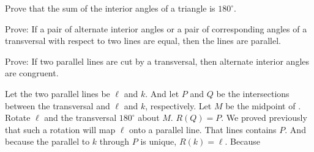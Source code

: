 \documentclass[nooutcomes]{ximera}
\begin{document}
\begin{question}
Prove that the sum of the interior angles of a triangle is $180^\circ$.
\end{question}

\begin{question}
Prove: If a pair of alternate interior angles or a pair of corresponding angles of a transversal with respect to two lines are equal, then the lines are parallel.
\begin{freeResponse}
\begin{hint}
\end{hint}
\end{freeResponse}
\end{question}

\begin{question}
Prove: If two parallel lines are cut by a transversal, then alternate interior angles are congruent.  
\begin{freeResponse}
\begin{hint}
Let the two parallel lines be $\ell$ and $k$.  And let $P$ and $Q$ be the intersections between the transversal and $\ell$ and $k$, respectively.  Let $M$ be the midpoint of .  Rotate $\ell$ and the transversal $180^\circ$ about $M$.  $R(Q)=P$.  We proved previously that such a rotation will map $\ell$ onto a parallel line.  That lines contains $P$.  And because the parallel to $k$ through $P$ is unique, $R(k)=\ell$.  Because 
\end{hint}
\end{freeResponse}
\end{question}
\end{document}
